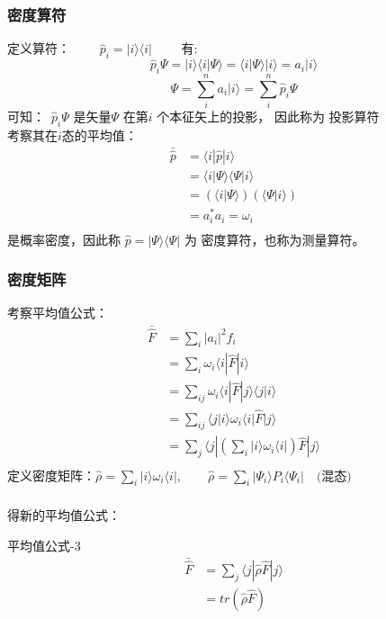 \begin{frame}
    \frametitle{密度算符}
    定义算符： $ \qquad  \hat{p}_i = |i\rangle\langle i | \qquad $ 有: 
    $$ \hat{p}_i\Psi= |i\rangle\langle i | \Psi \rangle = \langle i | \Psi \rangle |i\rangle=a_i |i\rangle $$
    $$\Psi= \sum\limits_i ^n a_i |i\rangle = \sum\limits_i ^n \hat{p}_i\Psi$$
    可知： $ \hat{p}_i\Psi $ 是矢量$\Psi$ 在第$i$ 个本征矢上的投影， 因此称为{\color{red} 投影算符}\\
    考察其在$i$态的平均值：
    $$ \begin{aligned}
    \bar{\hat{p}} &=\langle i |\hat{p} | i \rangle \\
               &=\langle i |\Psi\rangle\langle \Psi | i \rangle \\
               &=(\langle i |\Psi\rangle) (\langle \Psi | i \rangle) \\
               &=a_i ^* a_i =\omega_i \\
    \end{aligned} $$
    是概率密度，因此称 $\hat{p} = |\Psi\rangle\langle \Psi |$ 为 {\color{red} 密度算符}，也称为测量算符。
\end{frame} 
 
\begin{frame}
    \frametitle{密度矩阵}
    考察平均值公式：\\
    $$ \begin{aligned}
    \bar{\hat{F}} &=\sum\limits_i |a_i|^2 f_i \\
            &=\sum\limits_i \omega_i \langle i |\hat{F}|i \rangle  \\
            &=\sum\limits_{ij} \omega_i \langle i |\hat{F} |j\rangle \langle j| i\rangle  \\
            &=\sum\limits_{ij} \langle j| i\rangle  \omega_i \langle i |\hat{F} |j\rangle  \\
            &=\sum\limits_{j} \langle j | (\sum\limits_{i}| i \rangle  \omega_i \langle i |) \hat{F} |j\rangle  \\
    \end{aligned} $$
    定义密度矩阵：$ \hat{\rho} = \sum\limits_{i}| i \rangle  \omega_i \langle i | , \qquad \hat{\rho} = \sum\limits_{i}| \Psi_i \rangle  P_i \langle \Psi_i | \quad \text{(混态)} $
\end{frame} 
 
\begin{frame}  
    \frametitle{}  得新的平均值公式：
    \begin{tcolorbox1}{平均值公式-3}
         $$ \begin{aligned}
            \bar{\hat{F}}&=\sum\limits_{j} \langle j | \hat{\rho} \hat{F} |j\rangle \\
                &=tr (\hat{\rho} \hat{F} )
        \end{aligned} $$   
    \end{tcolorbox1} 
\end{frame} 
 
